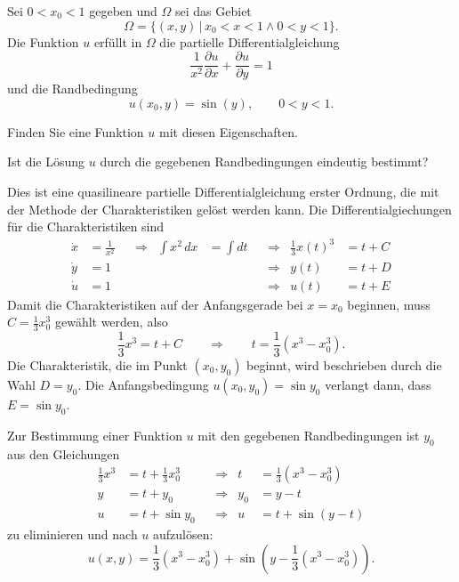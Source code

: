 Sei $0 < x_0 < 1$ gegeben und $\Omega$ sei das Gebiet
\[
\Omega
=
\{ (x,y)\,|\, x_0 < x < 1 \wedge 0 < y < 1 \}.
\]
Die Funktion $u$ erfüllt in $\Omega$ die partielle Differentialgleichung
\[
\frac{1}{x^2} \frac{\partial u}{\partial x}
+
\frac{\partial u}{\partial y}
=
1
\]
und die Randbedingung
\[
u(x_0, y) = \sin(y), \qquad 0 < y < 1.
\]
\begin{teilaufgaben}
\item
Finden Sie eine Funktion $u$ mit diesen Eigenschaften.
\item
Ist die Lösung $u$ durch die gegebenen Randbedingungen eindeutig bestimmt?
\end{teilaufgaben}

\begin{loesung}
Dies ist eine quasilineare partielle Differentialgleichung erster Ordnung, die
mit der Methode der Charakteristiken gelöst werden kann.
Die Differentialgiechungen für die Charakteristiken sind
\[
\begin{aligned}
\dot x &= \frac1{x^2} &&\Rightarrow& \int x^2\,dx &=\int dt &&\Rightarrow& \frac13 x(t)^3 &= t + C
\\
\dot y &= 1           &&           &              &         &&\Rightarrow& y(t) &= t + D
\\
\dot u &= 1           &&           &              &         &&\Rightarrow& u(t) &= t + E
\end{aligned}
\]
Damit die Charakteristiken auf der Anfangsgerade bei $x=x_0$ beginnen, muss
$C=\frac13x_0^3$ gewählt werden, also
\[
\frac13 x^3 = t + C
\qquad\Rightarrow\qquad
t = \frac13(x^3-x_0^3).
\]
Die Charakteristik, die im Punkt $(x_0,y_0)$ beginnt, wird beschrieben durch
die Wahl $D=y_0$.
Die Anfangsbedingung $u(x_0,y_0)=\sin y_0 $
verlangt dann, dass $E=\sin y_0 $.
\begin{teilaufgaben}
\item Zur Bestimmung einer Funktion $u$ mit den gegebenen Randbedingungen
ist $y_0$ aus den Gleichungen
\[
\begin{aligned}
{\textstyle\frac13}x^3 &= t + {\textstyle\frac13}x_0^3 &&\Rightarrow& t   &= \textstyle{\frac13}(x^3-x_0^3) \\
y           &= t + y_0          &&\Rightarrow& y_0 &= y - t              \\
u           &= t + \sin y_0     &&\Rightarrow& u   &= t + \sin(y-t)
\end{aligned}
\]
zu eliminieren und nach $u$ aufzulösen:
\[
u(x,y) = 
{\textstyle \frac13}(x^3-x_0^3)
+
\sin (y-{\textstyle \frac13}(x^3-x_0^3)).
\]
\end{teilaufgaben}
\end{loesung}
